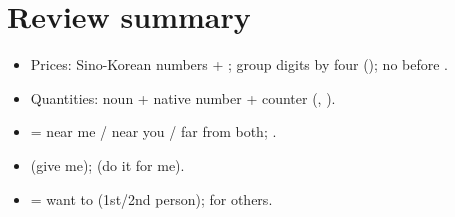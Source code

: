 \section*{Review summary}
\begin{itemize}
  \item Prices: Sino-Korean numbers + ; group digits by four (); no
         before .
  \item Quantities: noun + native number + counter (, ).
  \item {} = near me / near you / far from both; .
  \item {} (give me);  (do it for me).
  \item {} = want to (1st/2nd person);  for others.
\end{itemize}
